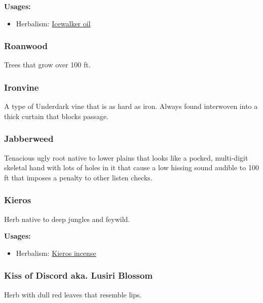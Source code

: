 \textbf{Usages:}

\begin{itemize}[noitemsep]
\item[] Herbalism: \hyperref[Icewalker oil]{Icewalker oil}
\end{itemize}

\subsubsection{Roanwood}

Trees that grow over 100 ft.

\subsubsection{Ironvine}

A type of Underdark vine that is as hard as iron. Always found interwoven into a thick curtain that blocks passage.

\subsubsection{Jabberweed}

Tenacious ugly root native to lower plains that looks like a pocked, multi-digit skeletal hand with lots of holes in it that cause a low hissing sound audible to 100 ft that imposes a penalty to other listen checks. 

\subsubsection{Kieros}
\label{Kieros}

Herb native to deep jungles and feywild.

\vspace{5mm}

\textbf{Usages:}

\begin{itemize}[noitemsep]
\item[] Herbalism: \hyperref[Kieros incense]{Kieros incense}
\end{itemize}

\subsubsection{Kiss of Discord aka. Lusiri Blossom}
\label{Kiss of Discord}

Herb with dull red leaves that resemble lips.

\vspace{5mm}


